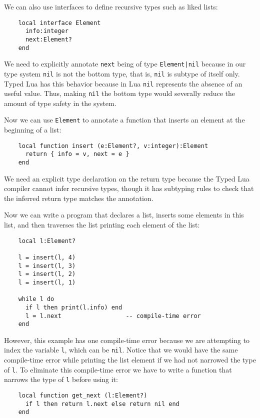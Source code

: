 We can also use interfaces to define recursive types such as liked lists:

\begin{verbatim}
    local interface Element
      info:integer
      next:Element?
    end
\end{verbatim}

We need to explicitly annotate \texttt{next} being of type
\texttt{Element|nil} because in our type system \texttt{nil}
is not the bottom type, that is, \texttt{nil} is subtype of itself only.
Typed Lua has this behavior because in Lua \texttt{nil} represents
the absence of an useful value.
Thus, making \texttt{nil} the bottom type would severally reduce the amount
of type safety in the system.

Now we can use \texttt{Element} to annotate a function that
inserts an element at the beginning of a list:
\begin{verbatim}
    local function insert (e:Element?, v:integer):Element 
      return { info = v, next = e }
    end
\end{verbatim}

We need an explicit type declaration on the return type because
the Typed Lua compiler cannot infer recursive types, though
it has subtyping rules to check that the inferred return type
matches the annotation.

Now we can write a program that declares a list, inserts some
elements in this list, and then traverses the list printing
each element of the list:
\begin{verbatim}
    local l:Element?

    l = insert(l, 4)
    l = insert(l, 3)
    l = insert(l, 2)
    l = insert(l, 1)

    while l do
      if l then print(l.info) end
      l = l.next                  -- compile-time error
    end
\end{verbatim}

However, this example has one compile-time error because we
are attempting to index the variable \texttt{l},
which can be \texttt{nil}.
Notice that we would have the same compile-time error while
printing the list element if we had not narrowed the type of
\texttt{l}.
To eliminate this compile-time error we have to write a
function that narrows the type of \texttt{l} before using it:
\begin{verbatim}
    local function get_next (l:Element?)
      if l then return l.next else return nil end
    end
\end{verbatim}

